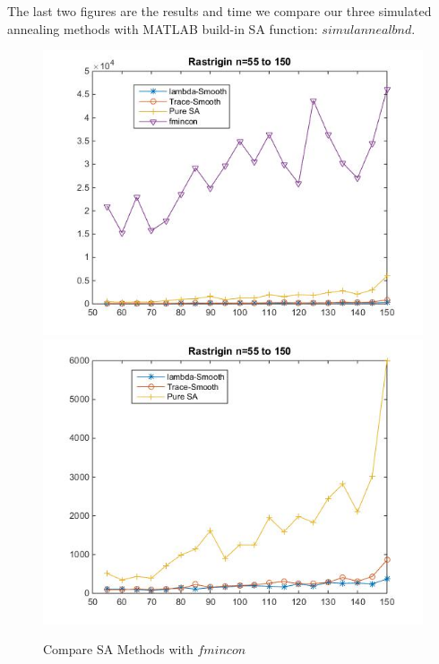 \documentclass[letterpaper,12pt,titlepage,oneside,final]{book}
\begin{document}
The last two figures are the results and time we compare our three simulated annealing methods with MATLAB build-in SA function: $simulannealbnd$. 

\begin{figure}[H]
\includegraphics[scale=0.7]{rast1.jpg}
\includegraphics[scale=0.7]{rast2.jpg}
\caption{Compare SA Methods with $fmincon$}
\end{figure}
\end{document}

